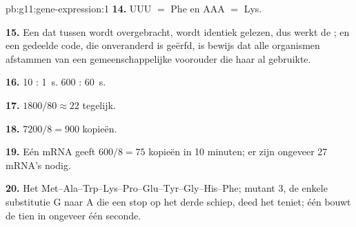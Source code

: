 \begin{solution}{pb:g11:gene-expression:1}
\textbf{14.} UUU $=$ Phe en AAA $=$ Lys.

\textbf{15.} Een  dat tussen  wordt overgebracht, wordt
identiek gelezen, dus werkt de ; en een gedeelde code, die
onveranderd is geërfd, is bewijs dat alle organismen afstammen van een
gemeenschappelijke voorouder die haar al gebruikte.

\textbf{16.} 10 : \qty{1}{s}. 600 : \qty{60}{s}.

\textbf{17.} $1800/80 \approx 22$  tegelijk.

\textbf{18.} $7200/8 = 900$ kopieën.

\textbf{19.} Eén mRNA geeft $600/8 = 75$ kopieën in 10 minuten; er zijn
ongeveer 27 mRNA's nodig.

\textbf{20.} Het 
Met--Ala--Trp--Lys--Pro--Glu--Tyr--Gly--His--Phe; mutant 3, de enkele
substitutie G naar A die een stop op het derde  schiep, deed het
teniet; één  bouwt de tien  in ongeveer één seconde.
\end{solution}
